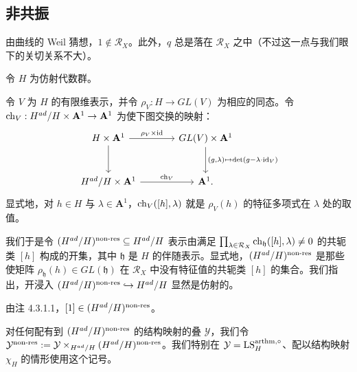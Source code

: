\subsection{非共振}


\begin{remark}
由曲线的 Weil 猜想，$1 \notin \mathcal{R}_X$。此外，$q$ 总是落在 $\mathcal{R}_X$ 之中（不过这一点与我们眼下的关切关系不大）。
\end{remark}

\pnum{}令 $H$ 为仿射代数群。

令 $V$ 为 $H$ 的有限维表示，并令 $\rho_V : H \to GL(V)$ 为相应的同态。令 $\operatorname{ch}_V : H^{ad}/H \times \mathbf{A}^1 \to \mathbf{A}^1$ 为使下图交换的映射：
\[
\begin{tikzcd}[column sep=large, row sep=large]
  H \times \mathbf{A}^1 \arrow[r, "\rho_V \times \id"] \arrow[d]
    & GL(V) \times \mathbf{A}^1 \arrow[d, "{(g,\lambda) \mapsto \det(g-\lambda\cdot\id_V)}"] \\
  H^{ad}/H \times \mathbf{A}^1 \arrow[r, "\ch_V"]
    & \mathbf{A}^1.
\end{tikzcd}
\]
显式地，对 $h \in H$ 与 $\lambda \in \mathbf{A}^1$，$\operatorname{ch}_V([h],\lambda)$ 就是 $\rho_V(h)$ 的特征多项式在 $\lambda$ 处的取值。

我们于是令 $(H^{ad}/H)^{\mathrm{non}\text{-}\mathrm{res}} \subseteq H^{ad}/H$ 表示由满足 $\prod_{\lambda \in \mathcal{R}_X} \operatorname{ch}_{\mathfrak{h}}([h],\lambda) \neq 0$ 的共轭类 $[h]$ 构成的开集，其中 $\mathfrak{h}$ 是 $H$ 的伴随表示。显式地，$(H^{ad}/H)^{\mathrm{non}\text{-}\mathrm{res}}$ 是那些使矩阵 $\rho_{\mathfrak{h}}(h) \in GL(\mathfrak{h})$ 在 $\mathcal{R}_X$ 中没有特征值的共轭类 $[h]$ 的集合。我们指出，开浸入 $(H^{ad}/H)^{\mathrm{non}\text{-}\mathrm{res}} \hookrightarrow H^{ad}/H$ 显然是仿射的。

\begin{remark}
由注 4.3.1.1，$[1] \in (H^{ad}/H)^{\mathrm{non}\text{-}\mathrm{res}}$。
\end{remark}

\begin{notation}
对任何配有到 $(H^{ad}/H)^{\mathrm{non}\text{-}\mathrm{res}}$ 的结构映射的叠 $\mathcal{Y}$，我们令 $\mathcal{Y}^{\mathrm{non}\text{-}\mathrm{res}} := \mathcal{Y} \times_{H^{ad}/H} (H^{ad}/H)^{\mathrm{non}\text{-}\mathrm{res}}$。我们特别在 $\mathcal{Y} = \mathrm{LS}^{\mathrm{arthm},\circ}_H$、配以结构映射 $\chi_H$ 的情形使用这个记号。
\end{notation}

